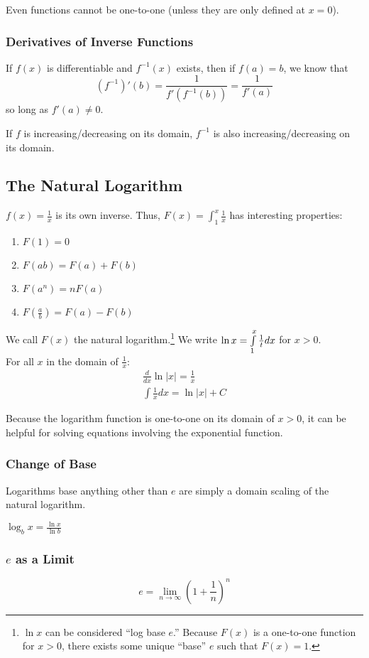 \documentclass{article}
\begin{document}
Even functions cannot be one-to-one (unless they are only defined at $x=0$).

\subsubsection{Derivatives of Inverse Functions} \label{inverse-derivatives}
If $f(x)$ is differentiable and $f^{-1}(x)$ exists, then if $f(a)=b$, we know that
$$(f^{-1})'(b)=\frac{1}{f'(f^{-1}(b))}=\frac{1}{f'(a)}$$
so long as $f'(a)\ne0$.

If $f$ is increasing/decreasing on its domain, $f^{-1}$ is also increasing/decreasing on its domain.

\subsection{The Natural Logarithm}
$f(x)=\frac{1}{x}$ is its own inverse. Thus, $F(x)=\int_1^x\frac{1}{x}$ has interesting properties:
\begin{enumerate}
    \item $F(1)=0$
    \item $F(ab)=F(a)+F(b)$
    \item $F(a^n)=nF(a)$
    \item $F(\frac{a}{b})=F(a)-F(b)$
\end{enumerate}
We call $F(x)$ the natural logarithm.\footnote{$\ln{x}$ can be considered ``log base $e$.'' Because $F(x)$ is a one-to-one function for $x>0$, there exists some unique ``base'' $e$ such that $F(x)=1$.} We write $\ln{x}=\int_1^x\limits\frac{1}{t}dx$ for $x>0$.\\
For all $x$ in the domain of $\frac{1}{x}$:
\begin{align*}
  \frac{d}{dx}\ln{|x|}=\frac{1}{x}\\
  \int\frac{1}{x}dx=\ln{|x|}+C
\end{align*}

Because the logarithm function is one-to-one on its domain of $x>0$, it can be helpful for solving equations involving the exponential function.

\subsubsection{Change of Base}
Logarithms base anything other than $e$ are simply a domain scaling of the natural logarithm.

$\log_bx=\frac{\ln{x}}{\ln{b}}$

\subsubsection{\texorpdfstring{$e$ as a Limit}{e as a Limit}}
$$e=\lim_{n\to\infty}\left(1+\frac{1}{n}\right)^n$$
\end{document}
